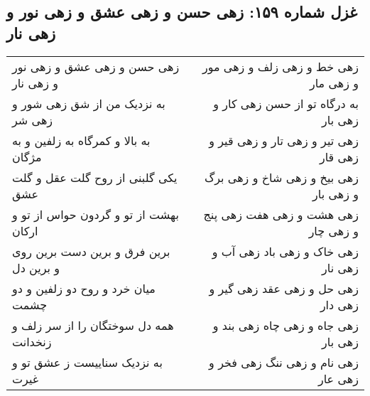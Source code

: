 \begin{center}
\section*{غزل شماره ۱۵۹: زهی حسن و زهی عشق و زهی نور و زهی نار}
\label{sec:159}
\begin{longtable}{l p{0.5cm} r}
زهی حسن و زهی عشق و زهی نور و زهی نار
&&
زهی خط و زهی زلف و زهی مور و زهی مار
\\
به نزدیک من از شق زهی شور و زهی شر
&&
به درگاه تو از حسن زهی کار و زهی بار
\\
به بالا و کمرگاه به زلفین و به مژگان
&&
زهی تیر و زهی تار و زهی قیر و زهی قار
\\
یکی گلبنی از روح گلت عقل و گلت عشق
&&
زهی بیخ و زهی شاخ و زهی برگ و زهی بار
\\
بهشت از تو و گردون حواس از تو و ارکان
&&
زهی هشت و زهی هفت زهی پنج و زهی چار
\\
برین فرق و برین دست برین روی و برین دل
&&
زهی خاک و زهی باد زهی آب و زهی نار
\\
میان خرد و روح دو زلفین و دو چشمت
&&
زهی حل و زهی عقد زهی گیر و زهی دار
\\
همه دل سوختگان را از سر زلف و زنخدانت
&&
زهی جاه و زهی چاه زهی بند و زهی بار
\\
به نزدیک سناییست ز عشق تو و غیرت
&&
زهی نام و زهی ننگ زهی فخر و زهی عار
\\
\end{longtable}
\end{center}
